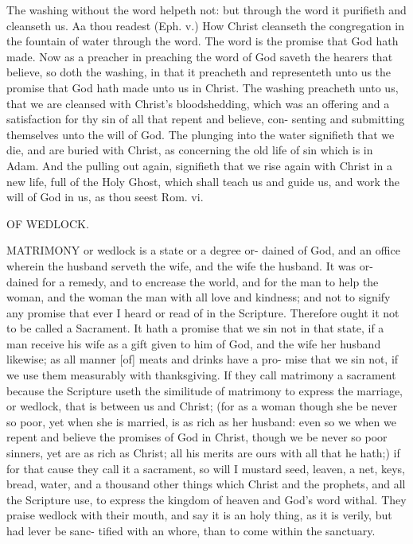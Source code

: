 \documentclass{custom}
\begin{document}
The washing without the word helpeth not: but through 
the word it purifieth and cleanseth us. Aa thou readest 
(Eph. v.) How Christ cleanseth the congregation in the 
fountain of water through the word. The word is the 
promise that God hath made. Now as a preacher in 
preaching the word of God saveth the hearers that believe, 
so doth the washing, in that it preacheth and representeth 
unto us the promise that God hath made unto us in Christ. 
The washing preacheth unto us, that we are cleansed 
with Christ's bloodshedding, which was an offering and a 
satisfaction for thy sin of all that repent and believe, con- 
senting and submitting themselves unto the will of God. 
The plunging into the water signifieth that we die, and 
are buried with Christ, as concerning the old life of sin 
which is in Adam. And the pulling out again, signifieth 
that we rise again with Christ in a new life, full of the 
Holy Ghost, which shall teach us and guide us, and work 
the will of God in us, as thou seest Rom. vi. 


OF WEDLOCK. 

MATRIMONY or wedlock is a state or a degree or- 
dained of God, and an office wherein the husband 
serveth the wife, and the wife the husband. It was or- 
dained for a remedy, and to encrease the world, and for 
the man to help the woman, and the woman the man with 
all love and kindness; and not to signify any promise that 
ever I heard or read of in the Scripture. Therefore 
ought it not to be called a Sacrament. It hath a promise 
that we sin not in that state, if a man receive his wife as 
a gift given to him of God, and the wife her husband 
likewise; as all manner [of] meats and drinks have a pro- 
mise that we sin not, if we use them measurably with 
thanksgiving. If they call matrimony a sacrament because 
the Scripture useth the similitude of matrimony to express 
the marriage, or wedlock, that is between us and Christ; 
(for as a woman though she be never so poor, yet when 
she is married, is as rich as her husband: even so we when 
we repent and believe the promises of God in Christ, 
though we be never so poor sinners, yet are as rich as 
Christ; all his merits are ours with all that he hath;) if 
for that cause they call it a sacrament, so will I mustard 
seed, leaven, a net, keys, bread, water, and a thousand 
other things which Christ and the prophets, and all the 
Scripture use, to express the kingdom of heaven and God's 
word withal. They praise wedlock with their mouth, and 
say it is an holy thing, as it is verily, but had lever be sanc- 
tified with an whore, than to come within the sanctuary. 
\end{document}
